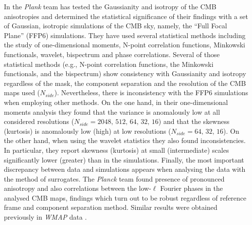 In \cite{Ade:2013nlj} the \textit{Plank} team has tested the Gaussianity and isotropy of  the CMB anisotropies and determined the statistical significance of their findings with a set of Gaussian, isotropic simulations of the CMB sky, namely, the ``Full Focal Plane'' (FFP6) simulations. They have used several statistical methods including the study of one-dimensional moments, N-point correlation functions, Minkowski functionals, wavelet, bispectrum and phase correlations. Several of those statistical methods (e.g., N-point correlation functions, the Minkowski functionals, and the bispectrum) show consistency with Gaussianity and isotropy regardless of the mask, the component separation and the resolution of the CMB maps used ($N_{side}$). Nevertheless, there is inconsistency with the FFP6 simulations when employing other methods. On the one hand, in their one-dimensional moments analysis they found that the variance is anomalously low at all considered resolutions ($N_{side}=2048,\, 512,\, 64,\, 32,\, 16$) and that the skewness (kurtosis) is anomalously low (high) at low resolutions ($N_{side}=64,\,32,\,16$). On the other hand, when using the wavelet statistics they also found inconsistencies. In particular, they report skewness (kurtosis) at small (intermediate) scales significantly lower (greater) than in the simulations. Finally, the most important discrepancy between data and simulations appears when analysing the data with the method of surrogates. The \textit{Planck} team found presence of pronounced anisotropy and also correlations between the low-$\ell$ Fourier phases in the analysed CMB maps, findings which turn out to be robust regardless of reference frame and component separation method. Similar results were obtained previously in \textit{WMAP} data \cite{Rossmanith:2009cy}. 

